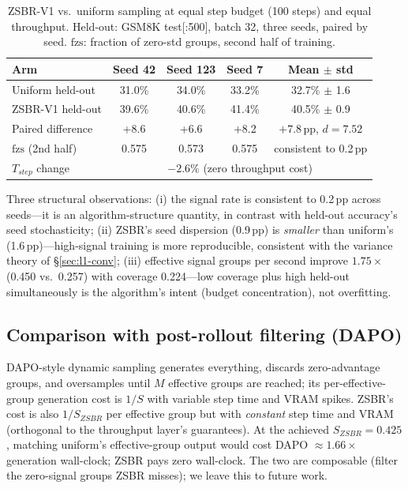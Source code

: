 \documentclass[11pt]{article}
\theoremstyle{definition}
\newcommand{\fzs}{\text{fzs}}
\begin{document}
\begin{table}[t]
\centering\small
\caption{ZSBR-V1 vs.\ uniform sampling at equal step budget (100 steps) and equal
throughput. Held-out: GSM8K test[:500], batch 32, three seeds, paired by seed.
$\fzs$: fraction of zero-std groups, second half of training.}
\label{tab:zsbr-main}
\begin{tabular}{@{}lcccc@{}}
\toprule
Arm & Seed 42 & Seed 123 & Seed 7 & Mean $\pm$ std \\
\midrule
Uniform held-out & 31.0\% & 34.0\% & 33.2\% & 32.7\% $\pm$ 1.6 \\
ZSBR-V1 held-out & 39.6\% & 40.6\% & 41.4\% & 40.5\% $\pm$ 0.9 \\
\midrule
Paired difference & +8.6 & +6.6 & +8.2 & $+7.8$\,pp, $d{=}7.52$ \\
$\fzs$ (2nd half) & 0.575 & 0.573 & 0.575 & consistent to 0.2\,pp \\
$T_{step}$ change & \multicolumn{4}{c}{$-2.6\%$ (zero throughput cost)} \\
\bottomrule
\end{tabular}
\end{table}

Three structural observations: (i) the signal rate is consistent to 0.2\,pp across
seeds---it is an algorithm-structure quantity, in contrast with held-out
accuracy's seed stochasticity; (ii) ZSBR's seed dispersion (0.9\,pp) is
\emph{smaller} than uniform's (1.6\,pp)---high-signal training is more
reproducible, consistent with the variance theory of \S\ref{sec:l1-conv};
(iii) effective signal groups per second improve $1.75\times$ (0.450 vs.\
0.257) with coverage 0.224---low coverage plus high held-out simultaneously is
the algorithm's intent (budget concentration), not overfitting.

\subsection{Comparison with post-rollout filtering (DAPO)}\label{sec:l2-dapo}
DAPO-style dynamic sampling generates everything, discards zero-advantage groups,
and oversamples until $M$ effective groups are reached; its per-effective-group
generation cost is $1/S$ with variable step time and VRAM spikes. ZSBR's cost is
also $1/S_{ZSBR}$ per effective group but with \emph{constant} step time and VRAM
(orthogonal to the throughput layer's guarantees). At the achieved
$S_{ZSBR}{=}0.425$, matching uniform's effective-group output would cost DAPO
${\approx}1.66\times$ generation wall-clock; ZSBR pays zero wall-clock. The two
are composable (filter the zero-signal groups ZSBR misses); we leave this to
future work.
\end{document}
